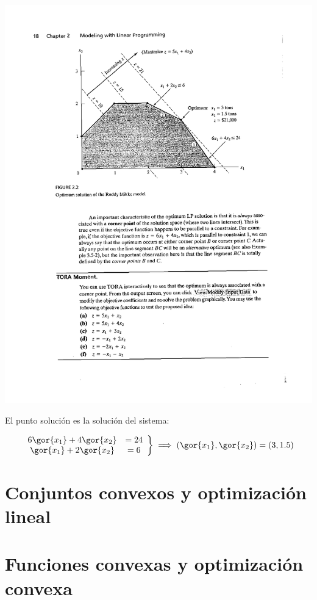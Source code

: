 \documentclass[palatino,nochap]{apuntes}
\begin{document}
\begin{example}
\begin{center}
\includegraphics[scale=0.8]{tex/berrendero/tema1/_GraficoEjemplo2}
\end{center}


El punto solución es la solución del sistema:

\[
\left.\begin{array}{cc} 6\gor{x_1} + 4\gor{x_2} &= 24\\ \gor{x_1} + 2\gor{x_2} &= 6\end{array}\right\} \implies (\gor{x_1},\gor{x_2}) = (3,1.5)
\]
\end{example}


\chapter{Conjuntos convexos y optimización lineal}



\chapter{Funciones convexas y optimización convexa}

\end{document}
